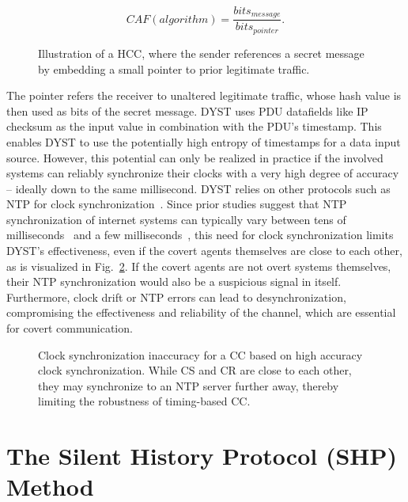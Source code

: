 \documentclass[journal]{IEEEtran}
\begin{document}
\[ CAF(algorithm) = \frac{bits_{message}}{bits_{pointer}}. \]

\begin{figure}[h]
  \centering
  
  \caption{Illustration of a \ac{HCC}, where the sender references a secret message by embedding a small pointer to prior legitimate traffic.}
  \label{fig:hcc}
\end{figure}

The pointer refers the receiver to unaltered legitimate traffic, whose hash value is then used as bits of the secret message. \ac{DYST} uses \ac{PDU} datafields like IP checksum as the input value in combination with the \ac{PDU}'s timestamp. This enables \ac{DYST} to use the potentially high entropy of timestamps for a data input source. However, this potential can only be realized in practice if the involved systems can reliably synchronize their clocks with a very high degree of accuracy -- ideally down to the same millisecond. \ac{DYST} relies on other protocols such as NTP for clock synchronization~\cite{DYST22}. Since prior studies suggest that NTP synchronization of internet systems can typically vary between tens of milliseconds~\cite{ntp13} and a few milliseconds~\cite{ntp19}, this need for clock synchronization limits \ac{DYST}'s effectiveness, even if the covert agents themselves are close to each other, as is visualized in Fig.~\ref{fig:clocksync}. If the covert agents are not overt systems themselves, their NTP synchronization would also be a suspicious signal in itself. Furthermore, clock drift or NTP errors can lead to desynchronization, compromising the effectiveness and reliability of the channel, which are essential for covert communication.

\begin{figure}[h]
  \centering
  
  \caption{Clock synchronization inaccuracy for a \ac{CC} based on high accuracy clock synchronization. While \ac{CS} and \ac{CR} are close to each other, they may synchronize to an NTP server further away, thereby limiting the robustness of timing-based \ac{CC}.}
  \label{fig:clocksync}
\end{figure}



\section{The Silent History Protocol (SHP) Method}
\end{document}
